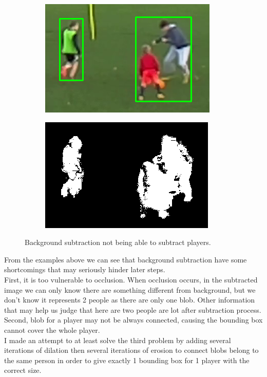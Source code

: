 \documentclass{article}
\begin{document}
\begin{figure}[h!]
  \centering
  \begin{subfigure}[b]{0.4\linewidth}
    \includegraphics[scale=0.4]{report/pic/3/occlusion_1.png} 
  \end{subfigure}
  \begin{subfigure}[b]{0.4\linewidth}
    \includegraphics[scale=0.4]{report/pic/3/occlusion_0.png} 
  \end{subfigure}
  \caption{Background subtraction not being able to subtract players.}
\end{figure}
From the examples above we can see that background subtraction have some shortcomings that may seriously hinder later steps.\\
First, it is too vulnerable to occlusion. When occlusion occurs, in the subtracted image we can only know there are something different from background, but we don’t know it represents 2 people as there are only one blob. Other information that may help us judge that here are two people are lot after subtraction process.\\
Second, blob for a player may not be always connected, causing the bounding box cannot cover the whole player.\\
I made an attempt to at least solve the third problem by adding several iterations of dilation then several iterations of erosion to connect blobs belong to the same person in order to give exactly 1 bounding box for 1 player with the correct size.\\
\end{document}
